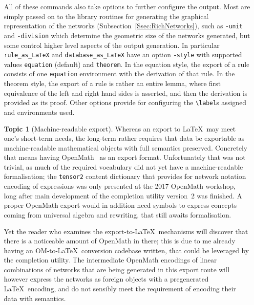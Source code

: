\documentclass{article}
\theoremstyle{definition}
\newtheorem{topic}{Topic}
\begin{document}
All of these commands also take options to further configure the 
output. Most are simply passed on to the library routines for 
generating the graphical representation of the networks 
(Subsection~\ref{Ssec:RichNetworks}), such as \texttt{-unit} and 
\texttt{-division} which determine the geometric size of the networks 
generated, but some control higher level aspects of the output 
generation. In particular \verb|rule_as_LaTeX| and 
\verb|database_as_LaTeX| have an option \texttt{-style} with 
supported values \texttt{equation} (default) and \texttt{theorem}. In 
the equation style, the export of a rule consists of one 
\texttt{equation} environment with the derivation of that rule. In 
the theorem style, the export of a rule is rather an entire lemma, 
where first equivalence of the left and right hand sides is 
asserted, and then the derivation is provided as its proof. Other 
options provide for configuring the \verb|\label|s assigned and 
environments used.

\begin{topic}[Machine-readable export]
  Whereas an export to \LaTeX\ may meet one's short-term needs, the 
  long-term rather requires that data be exportable as 
  machine-readable mathematical objects with full semantics 
  preserved. Concretely that means having OpenMath~\cite{omstd} as an 
  export format. Unfortunately that was not trivial, as much of the 
  required vocabulary did not yet have a machine-readable 
  formalisation; the \texttt{tensor2} content dictionary that provides 
  for network notation encoding of expressions was only presented at 
  the 2017 OpenMath workshop, long after main development of the 
  completion utility version~2 was finished. A proper OpenMath export 
  would in addition need symbols to express concepts coming from 
  universal algebra and rewriting, that still awaits formalisation.
  
  Yet the reader who examines the export-to-\LaTeX\ mechanisms will 
  discover that there is a noticeable amount of OpenMath in there; 
  this is due to me already having an OM-to-\LaTeX\ conversion 
  codebase written, that could be leveraged by the completion utility. 
  The intermediate OpenMath encodings of linear combinations of 
  networks that are being generated in this export route will however 
  express the networks as foreign objects with a pregenerated \LaTeX\ 
  encoding, and do not sensibly meet the requirement of encoding 
  their data with semantics.
\end{topic}
\end{document}
